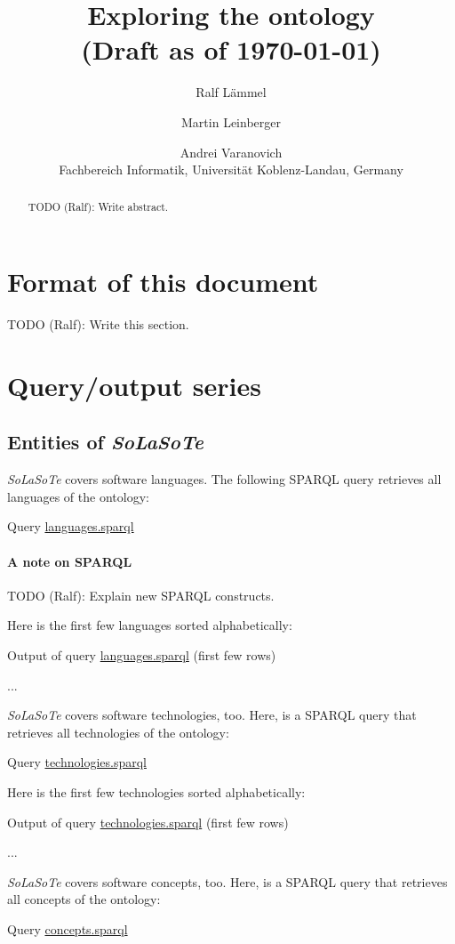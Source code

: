 \documentclass{article}
\title{Exploring the \solasote{} ontology\\
(Draft as of \today)}
\author{Ralf L\"ammel \and Martin Leinberger \and Andrei Varanovich\\
Fachbereich Informatik, Universit\"at Koblenz-Landau, Germany}
\newcommand{\todo}[2]{\noindent{}TODO (#1): #2}
\newcommand{\solasote}{{\itshape\textsf{SoLaSoTe}}}
\newcommand{\sparqlnote}[1]{
\paragraph{A note on SPARQL} #1
}
\newcommand{\sparql}[1]{%
\medskip

\noindent
\begin{boxedminipage}{\hsize}
\hfill{}Query \underline{#1.sparql}

\end{boxedminipage}
\medskip
}
\newcommand{\partialOutput}[2]{%

\medskip

\noindent
\begin{boxedminipage}{\hsize}
\hfill{}Output of query \underline{#2.sparql} (first few rows)

{\large{}...}
\end{boxedminipage}
\medskip
}
\begin{document}
\maketitle

\begin{abstract}
\todo{Ralf}{Write abstract.}
\end{abstract}

\tableofcontents


\section{Format of this document}

\todo{Ralf}{Write this section.}


\section{Query/output series}


\subsection{Entities of \solasote}

\solasote{} covers software languages. The following SPARQL query
retrieves all languages of the ontology:

\sparql{languages}

\sparqlnote{\todo{Ralf}{Explain new SPARQL constructs.}}

\noindent
Here is the first few languages sorted alphabetically:

\partialOutput{7}{languages}

\noindent
\solasote{} covers software technologies, too. Here, is a SPARQL query
that retrieves all technologies of the ontology:

\sparql{technologies}

\noindent
Here is the first few technologies sorted alphabetically:

\partialOutput{7}{technologies}

\noindent
\solasote{} covers software concepts, too. Here, is a SPARQL query
that retrieves all concepts of the ontology:

\sparql{concepts}
\end{document}
